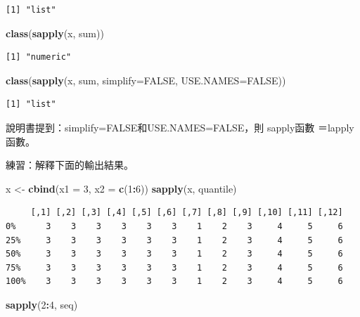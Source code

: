 \documentclass[]{book}
\newenvironment{Shaded}{\begin{snugshade}}{\end{snugshade}}
\newcommand{\DataTypeTok}[1]{\textcolor[rgb]{0.13,0.29,0.53}{#1}}
\newcommand{\DecValTok}[1]{\textcolor[rgb]{0.00,0.00,0.81}{#1}}
\newcommand{\KeywordTok}[1]{\textcolor[rgb]{0.13,0.29,0.53}{\textbf{#1}}}
\newcommand{\NormalTok}[1]{#1}
\newcommand{\OperatorTok}[1]{\textcolor[rgb]{0.81,0.36,0.00}{\textbf{#1}}}
\newcommand{\OtherTok}[1]{\textcolor[rgb]{0.56,0.35,0.01}{#1}}
\newcommand{\StringTok}[1]{\textcolor[rgb]{0.31,0.60,0.02}{#1}}
\theoremstyle{definition}
\theoremstyle{definition}
\theoremstyle{definition}
\theoremstyle{remark}
\begin{document}
\begin{verbatim}
[1] "list"
\end{verbatim}

\begin{Shaded}
\begin{Highlighting}[]
\KeywordTok{class}\NormalTok{(}\KeywordTok{sapply}\NormalTok{(x, sum))}
\end{Highlighting}
\end{Shaded}

\begin{verbatim}
[1] "numeric"
\end{verbatim}

\begin{Shaded}
\begin{Highlighting}[]
\KeywordTok{class}\NormalTok{(}\KeywordTok{sapply}\NormalTok{(x, sum, }\DataTypeTok{simplify=}\OtherTok{FALSE}\NormalTok{, }\DataTypeTok{USE.NAMES=}\OtherTok{FALSE}\NormalTok{))}
\end{Highlighting}
\end{Shaded}

\begin{verbatim}
[1] "list"
\end{verbatim}

說明書提到：simplify=FALSE和USE.NAMES=FALSE，則 sapply函數
＝lapply函數。

練習：解釋下面的輸出結果。

\begin{Shaded}
\begin{Highlighting}[]
\NormalTok{x <-}\StringTok{ }\KeywordTok{cbind}\NormalTok{(}\DataTypeTok{x1 =} \DecValTok{3}\NormalTok{, }\DataTypeTok{x2 =} \KeywordTok{c}\NormalTok{(}\DecValTok{1}\OperatorTok{:}\DecValTok{6}\NormalTok{))}
\KeywordTok{sapply}\NormalTok{(x, quantile)   }
\end{Highlighting}
\end{Shaded}

\begin{verbatim}
     [,1] [,2] [,3] [,4] [,5] [,6] [,7] [,8] [,9] [,10] [,11] [,12]
0%      3    3    3    3    3    3    1    2    3     4     5     6
25%     3    3    3    3    3    3    1    2    3     4     5     6
50%     3    3    3    3    3    3    1    2    3     4     5     6
75%     3    3    3    3    3    3    1    2    3     4     5     6
100%    3    3    3    3    3    3    1    2    3     4     5     6
\end{verbatim}

\begin{Shaded}
\begin{Highlighting}[]
\KeywordTok{sapply}\NormalTok{(}\DecValTok{2}\OperatorTok{:}\DecValTok{4}\NormalTok{, seq)}
\end{Highlighting}
\end{Shaded}
\end{document}
